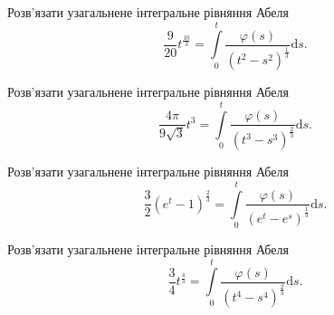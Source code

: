 \documentclass[12pt]{extarticle}
\begin{document}
\begin{Exercise}
Розв’язати узагальнене інтегральне рівняння Абеля \[\dfrac{9}{20} t^{\frac{10}{3}} = \int\limits_{0}^{t} \dfrac{\varphi(s)}{(t^2-s^2)^{\frac{1}{3}}} \mathrm{d}s.\]
\end{Exercise}

\begin{Exercise}
Розв’язати узагальнене інтегральне рівняння Абеля \[\dfrac{4\pi}{9\sqrt{3}} t^3 = \int\limits_{0}^{t} \dfrac{\varphi(s)}{(t^3-s^3)^{\frac{2}{3}}} \mathrm{d}s.\]
\end{Exercise}

\begin{Exercise}
Розв’язати узагальнене інтегральне рівняння Абеля \[\dfrac{3}{2} \left(e^{t}-1\right)^{\frac{2}{3}} = \int\limits_{0}^{t} \dfrac{\varphi(s)}{(e^t-e^s)^{\frac{1}{3}}} \mathrm{d}s.\]
\end{Exercise}

\begin{Exercise}
Розв’язати узагальнене інтегральне рівняння Абеля \[\dfrac{3}{4} t^{\frac{4}{3}} = \int\limits_{0}^{t} \dfrac{\varphi(s)}{(t^4-s^4)^{\frac{2}{3}}} \mathrm{d}s.\]
\end{Exercise}
\end{document}
